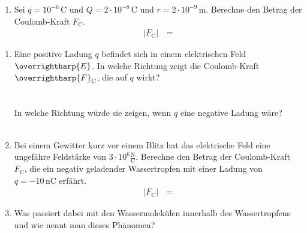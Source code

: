 \documentclass[task=1]{exercise}
\renewcommand{\vec}{\overrightharp}
\begin{document}
  \begin{enumerate}[label=\textnormal{\alph*)}]
    \item Sei $q = 10^{-6}\,\mathrm{C}$ und $Q = 2\cdot 10^{-8}\,\mathrm{C}$ und $r = 2\cdot 10^{-9}\,\mathrm{m}$. Berechne den Betrag der Coulomb-Kraft $F_\mathrm{C}$.
    \begin{align*}
      \left| F_\mathrm{C} \right| \, &=
    \end{align*}
  \end{enumerate}  
  
  \begin{enumerate}[label=\textnormal{\alph*)}]
    \item Eine positive Ladung $q$ befindet sich in einem elektrischen Feld $\vec{E}$. In welche Richtung zeigt die Coulomb-Kraft $\vec{F}_\mathrm{C}$, die auf $q$ wirkt?\\~\\~\\
    In welche Richtung w\"urde sie zeigen, wenn $q$ eine negative Ladung w\"are?\\~\\
    \item Bei einem Gewitter kurz vor einem Blitz hat das elektrische Feld eine ungef\"ahre Feldst\"arke von $3 \cdot 10^6 \frac{\mathrm{N}}{\mathrm{C}}$. Berechne den Betrag der Coulomb-Kraft $F_\mathrm{C}$, die ein negativ geladender Wassertropfen mit einer Ladung von $q = -10\,\mathrm{nC}$ erf\"ahrt.
    \begin{align*}
      \left| F_\mathrm{C} \right| \, &=
    \end{align*}
    \item Was passiert dabei mit den Wassermolekülen innerhalb des Wassertropfens und wie nennt man dieses Phänomen?\\~\\
  \end{enumerate}
  
\end{document}
